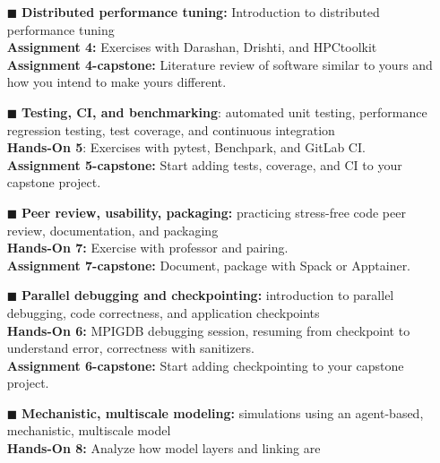 \documentclass{article}
\begin{document}
\begin{tcbposter}
{\begin{multicols}{2}
\begin{itemize}
        \textbf{Assignment 3-capstone:} Outline an informal list of
        goals and objectives to create a minimum viable product of
        your capstone code through the remainder of the semester.%
      \item[\textcolor{orange!90!black}{$\blacksquare$}] \textbf{
          Distributed performance tuning:} Introduction to distributed
        performance tuning\\
        \textbf{Assignment 4:} Exercises with Darashan, Drishti, and
        HPCtoolkit\\
        \textbf{Assignment 4-capstone:} Literature review of software
        similar to yours and how you intend to make yours different.%
      \item[\textcolor{blue!80!black}{$\blacksquare$}] \textbf{
          Testing, CI, and benchmarking}: automated unit testing,
        performance regression testing, test coverage, and continuous
        integration\\
        \textbf{Hands-On 5}: Exercises with pytest, Benchpark, and
        GitLab CI.\@\\
        \textbf{Assignment 5-capstone:} Start adding tests, coverage,
        and CI to your capstone project.%
      \item[\textcolor{blue!80!black}{$\blacksquare$}] \textbf{ Peer
          review, usability, packaging:} practicing stress-free code
        peer review, documentation, and packaging\\
        \textbf{Hands-On 7:} Exercise with professor and pairing.\\
        \textbf{Assignment 7-capstone:} Document, package with Spack
        or Apptainer.%
      \item[\textcolor{blue!80!black}{$\blacksquare$}] \textbf{
          Parallel debugging and checkpointing:} introduction to
        parallel
        debugging, code correctness, and application checkpoints\\
        \textbf{Hands-On 6:} MPIGDB debugging session, resuming from
        checkpoint
        to understand error, correctness with sanitizers.\@\\
        \textbf{Assignment 6-capstone:} Start adding checkpointing to
        your capstone project.%
      \item[\textcolor{green!50!black}{$\blacksquare$}] \textbf{
          Mechanistic, multiscale modeling:} simulations using an
        agent-based, mechanistic, multiscale model\\
        \textbf{Hands-On 8:} Analyze how model layers and linking are

\end{itemize}
\end{multicols}}
\end{tcbposter}
\end{document}
